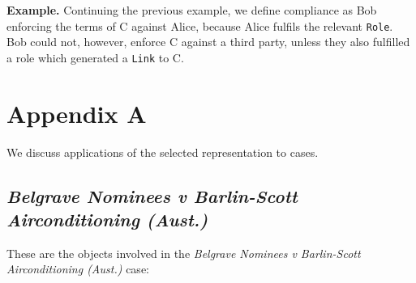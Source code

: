 \documentclass{article}
\newcounter{pic}[page]
\numberwithin{equation}{section}
\newcommand{\quickexample}[1]{
\begin{tcolorbox}
	\textbf{Example.} #1
\end{tcolorbox}
}
\begin{document}
\vspace{0.25cm}
\quickexample{
	Continuing the previous example, we define compliance as Bob enforcing the terms of C against Alice, because Alice fulfils the relevant \texttt{Role}. Bob could not, however, enforce C against a third party, unless they also fulfilled a role which generated a \texttt{Link} to C.
}
















\pagebreak
\section{Appendix A}

We discuss applications of the selected representation to cases.

\subsection{\textit{Belgrave Nominees v Barlin-Scott Airconditioning (Aust.)}}  

These are the objects involved in the \textit{Belgrave Nominees v Barlin-Scott Airconditioning (Aust.)} case:























\pagebreak
\end{document}
